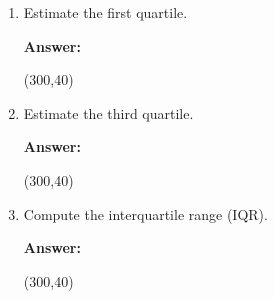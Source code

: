 \documentclass[12pt,twoside]{article}
\newcommand{\pts}[1]{\marginpar{ \small\hspace{0pt} \textit{[#1]} } }
\newcommand{\?}{\stackrel{?}{=}}
\begin{document}
\begin{enumerate}[\bf (a)]
\begin{enumerate}[\bf(i)]
\item Estimate the first quartile. \pts{1}
  
 \begin{minipage}[]{.1\linewidth}
    {\bf Answer:}
  \end{minipage}\qquad
  \begin{minipage}[]{.8\linewidth}
    \framebox(300,40){\Huge\phantom{t}}     
  \end{minipage}

  \bigskip
\item Estimate the third quartile. \pts{1}
  
 \begin{minipage}[]{.1\linewidth}
    {\bf Answer:}
  \end{minipage}\qquad
  \begin{minipage}[]{.8\linewidth}
    \framebox(300,40){\Huge\phantom{t}}     
  \end{minipage}

  \bigskip
\item Compute the interquartile range (IQR). \pts{1}
  
 \begin{minipage}[]{.1\linewidth}
    {\bf Answer:}
  \end{minipage}\qquad
  \begin{minipage}[]{.8\linewidth}
    \framebox(300,40){\Huge\phantom{t}}     
  \end{minipage}
\end{enumerate}
  \eject


  
  

\end{enumerate}
\end{document}

